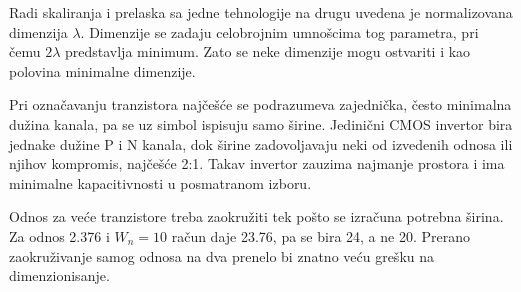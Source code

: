 Radi skaliranja i prelaska sa jedne tehnologije na drugu uvedena je normalizovana dimenzija $\lambda$. Dimenzije se zadaju celobrojnim umnošcima tog parametra, pri čemu $2\lambda$ predstavlja minimum. Zato se neke dimenzije mogu ostvariti i kao polovina minimalne dimenzije.

Pri označavanju tranzistora najčešće se podrazumeva zajednička, često minimalna dužina kanala, pa se uz simbol ispisuju samo širine. Jedinični CMOS invertor bira jednake dužine P i N kanala, dok širine zadovoljavaju neki od izvedenih odnosa ili njihov kompromis, najčešće 2:1. Takav invertor zauzima najmanje prostora i ima minimalne kapacitivnosti u posmatranom izboru.

Odnos za veće tranzistore treba zaokružiti tek pošto se izračuna potrebna širina. Za odnos 2.376 i $W_n=10$ račun daje 23.76, pa se bira 24, a ne 20. Prerano zaokruživanje samog odnosa na dva prenelo bi znatno veću grešku na dimenzionisanje.
